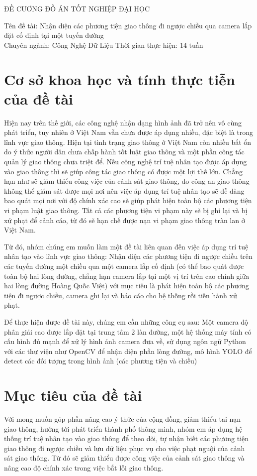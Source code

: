\documentclass[12pt,twoside,a4paper]{article}
\begin{document}
	

\pagebreak


\pagebreak

\begin{center}
ĐỀ CƯƠNG ĐỒ ÁN TỐT NGHIỆP ĐẠI HỌC
\end{center}
Tên đề tài: Nhận diện các phương tiện giao thông đi ngược chiều qua camera lắp đặt cố định tại một tuyến đường\\
Chuyên ngành: Công Nghệ Dữ Liệu
Thời gian thực hiện: 14 tuần


\section{Cơ sở khoa học và tính thực tiễn của đề tài}
Hiện nay trên thế giới, các công nghệ nhận dạng hình ảnh đã trở nên vô cùng phát triển, tuy nhiên ở Việt Nam vẫn chưa được áp dụng nhiều, đặc biệt là trong lĩnh vực giao thông. Hiện tại tình trạng giao thông ở Việt Nam còn nhiều bất ổn do ý thức người dân chưa chấp hành tốt luật giao thông và một phần công tác quản lý giao thông chưa triệt để. Nếu công nghệ trí tuệ nhân tạo được áp dụng vào giao thông thì sẽ giúp công tác giao thông có được một lợi thế lớn. Chẳng hạn như sẽ giảm thiểu công việc của cảnh sát giao thông, do công an giao thông không thể giám sát được mọi nơi nên việc áp dụng trí tuệ nhân tạo sẽ dễ dàng bao quát mọi nơi với độ chính xác cao sẽ giúp phát hiện toàn bộ các phương tiện vi phạm luật giao thông. Tất cả các phương tiện vi phạm này sẽ bị ghi lại và bị xử phạt để cảnh cáo, từ đó sẽ hạn chế được nạn vi phạm giao thông tràn lan ở Việt Nam.
\par
Từ đó, nhóm chúng em muốn làm một đề tài liên quan đến việc áp dụng trí tuệ nhân tạo vào lĩnh vực giao thông: Nhận diện các phương tiện đi ngược chiều trên các tuyến đường một chiều qua một camera lắp cố định (có thể bao quát được toàn bộ hai lòng đường, chẳng hạn camera lắp tại một vị trí trên cao chính giữa hai lòng đường Hoàng Quốc Việt) với mục tiêu là phát hiện toàn bộ các phương tiện đi ngược chiều, camera ghi lại và báo cáo cho hệ thống rồi tiến hành xử phạt.
\par
Để thực hiện được đề tài này, chúng em cần những công cụ sau: Một camera độ phân giải cao được lắp đặt tại trung tâm 2 làn đường, một hệ thống máy tính có cấu hình đủ mạnh để xử lý hình ảnh camera đưa về, sử dụng ngôn ngữ Python với các thư viện như OpenCV để nhận diện phần lòng đường, mô hình YOLO để detect các đối tượng trong hình ảnh (các phương tiện và chiều)
\section{Mục tiêu của đề tài}
Với mong muốn góp phần nâng cao ý thức của cộng đồng, giảm thiểu tai nạn giao thông, hướng tới phát triển thành phố thông minh, nhóm em áp dụng hệ thống trí tuệ nhân tạo vào giao thông để theo dõi, tự nhận biết các phương tiện giao thông đi ngược chiều và lưu dữ liệu phục vụ cho việc phạt nguội của cảnh sát giao thông. Từ đó sẽ giảm thiểu được công việc của cảnh sát giao thông và nâng cao độ chính xác trong việc bắt lỗi giao thông.
\end{document}
